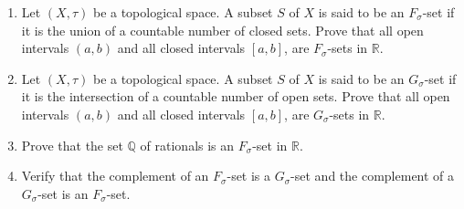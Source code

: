 \begin{exercise}
    \begin{enumerate}[label={(\roman*)}]
        \item Let $(X, \tau)$ be a topological space. A subset $S$ of $X$ is said to be an {\color{red}$F_{\sigma}$-set} if it is the union of a countable number of closed sets. Prove that all open intervals $(a, b)$ and all closed intervals $[a, b]$, are $F_{\sigma}$-sets in $\mathbb{R}$.
        \item Let $(X, \tau)$ be a topological space. A subset $S$ of $X$ is said to be an {\color{red}$G_{\sigma}$-set} if it is the intersection of a countable number of open sets. Prove that all open intervals $(a, b)$ and all closed intervals $[a, b]$, are $G_{\sigma}$-sets in $\mathbb{R}$.
        \item Prove that the set $\mathbb{Q}$ of rationals is an $F_{\sigma}$-set in $\mathbb{R}$.
        \item Verify that the complement of an $F_{\sigma}$-set is a $G_{\sigma}$-set and the complement of a $G_{\sigma}$-set is an $F_{\sigma}$-set.
    \end{enumerate}
\end{exercise}

